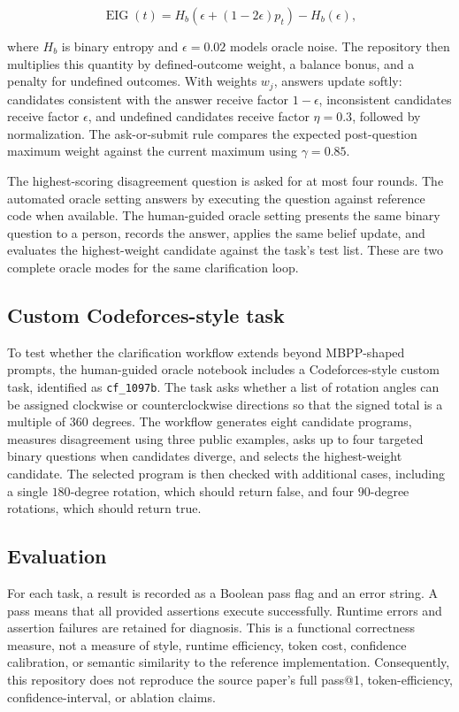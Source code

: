 \[
\operatorname{EIG}(t) = H_b\left(\epsilon + (1-2\epsilon)p_t\right) - H_b(\epsilon),
\]

where $H_b$ is binary entropy and $\epsilon=0.02$ models oracle noise. The repository then multiplies this quantity by defined-outcome weight, a balance bonus, and a penalty for undefined outcomes. With weights $w_j$, answers update softly: candidates consistent with the answer receive factor $1-\epsilon$, inconsistent candidates receive factor $\epsilon$, and undefined candidates receive factor $\eta=0.3$, followed by normalization. The ask-or-submit rule compares the expected post-question maximum weight against the current maximum using $\gamma=0.85$.

The highest-scoring disagreement question is asked for at most four rounds. The automated oracle setting answers by executing the question against reference code when available. The human-guided oracle setting presents the same binary question to a person, records the answer, applies the same belief update, and evaluates the highest-weight candidate against the task's test list. These are two complete oracle modes for the same clarification loop.

\subsection{Custom Codeforces-style task}

To test whether the clarification workflow extends beyond MBPP-shaped prompts, the human-guided oracle notebook includes a Codeforces-style custom task, identified as \texttt{cf\_1097b}. The task asks whether a list of rotation angles can be assigned clockwise or counterclockwise directions so that the signed total is a multiple of $360$ degrees. The workflow generates eight candidate programs, measures disagreement using three public examples, asks up to four targeted binary questions when candidates diverge, and selects the highest-weight candidate. The selected program is then checked with additional cases, including a single $180$-degree rotation, which should return false, and four $90$-degree rotations, which should return true.

\subsection{Evaluation}

For each task, a result is recorded as a Boolean pass flag and an error string. A pass means that all provided assertions execute successfully. Runtime errors and assertion failures are retained for diagnosis. This is a functional correctness measure, not a measure of style, runtime efficiency, token cost, confidence calibration, or semantic similarity to the reference implementation. Consequently, this repository does not reproduce the source paper's full pass@1, token-efficiency, confidence-interval, or ablation claims.
